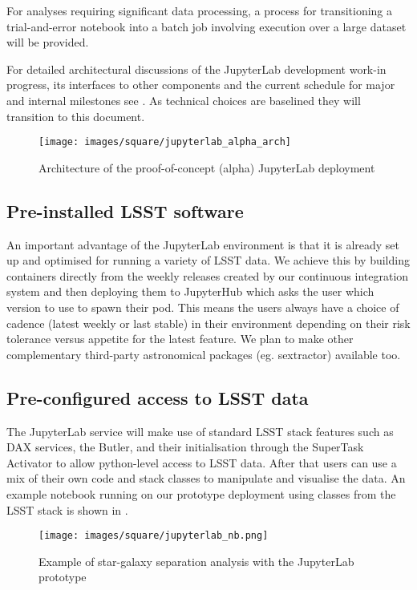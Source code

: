 For analyses requiring significant data processing, a process for transitioning a trial-and-error notebook into a batch job involving execution over a large dataset will be provided. 

For detailed architectural discussions of the JupyterLab development work-in progress, its interfaces to other components and the current schedule for major and internal milestones see . As technical choices are baselined they will transition to this document.

\begin{figure}
  \texttt{[image: images/square/jupyterlab\_alpha\_arch]}
  \caption{Architecture of the proof-of-concept (alpha) JupyterLab deployment}
  \label{fig:jlarch}
\end{figure}

\subsection{Pre-installed LSST software}\label{pre-installed-lsst-software}

An important advantage of the JupyterLab environment is that it is already set up and optimised for running a variety of LSST data. We achieve this by building containers directly from the weekly releases created by our continuous integration system and then deploying them to JupyterHub which asks the user which version to use to spawn their pod. This means the users always have a choice of cadence (latest weekly or last stable) in their environment depending on their risk tolerance versus appetite for the latest feature. We plan to make other complementary third-party astronomical packages (eg. sextractor) available too. 

\subsection{Pre-configured access to LSST data}\label{pre-configured-access-to-lsst-data}

The JupyterLab service will make use of standard LSST stack features such as DAX services, the Butler, and their initialisation through the SuperTask Activator to allow python-level access to LSST data. After that users can use a mix of their own code and stack classes to manipulate and visualise the data. An example notebook running on our prototype deployment using classes from the LSST stack is shown in .

\begin{figure}
  \texttt{[image: images/square/jupyterlab\_nb.png]}
  \caption{Example of star-galaxy separation analysis with the JupyterLab prototype}
  \label{fig:jlsimon}
\end{figure}

